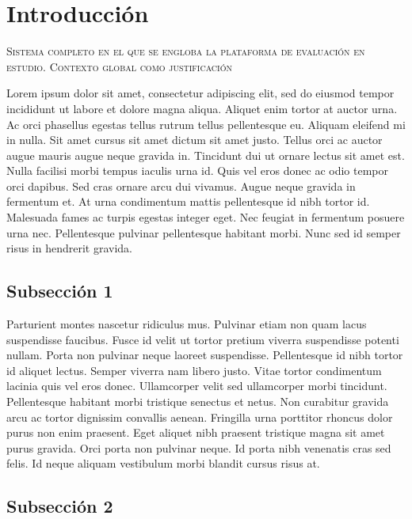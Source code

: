 \section{Introducción}

\vspace{0.5cm}

\Large\scshape
Sistema completo en el que se engloba la plataforma de evaluación en estudio. Contexto global como justificación
\normalfont

\divider

Lorem ipsum dolor sit amet, consectetur adipiscing elit, sed do eiusmod tempor incididunt ut labore et dolore magna aliqua. Aliquet enim tortor at auctor urna. Ac orci phasellus egestas tellus rutrum tellus pellentesque eu. Aliquam eleifend mi in nulla. Sit amet cursus sit amet dictum sit amet justo. Tellus orci ac auctor augue mauris augue neque gravida in. Tincidunt dui ut ornare lectus sit amet est. Nulla facilisi morbi tempus iaculis urna id. Quis vel eros donec ac odio tempor orci dapibus. Sed cras ornare arcu dui vivamus. Augue neque gravida in fermentum et. At urna condimentum mattis pellentesque id nibh tortor id. Malesuada fames ac turpis egestas integer eget. Nec feugiat in fermentum posuere urna nec. Pellentesque pulvinar pellentesque habitant morbi. Nunc sed id semper risus in hendrerit gravida.\\

\subsection{Subsección 1}

Parturient montes nascetur ridiculus mus. Pulvinar etiam non quam lacus suspendisse faucibus. Fusce id velit ut tortor pretium viverra suspendisse potenti nullam. Porta non pulvinar neque laoreet suspendisse. Pellentesque id nibh tortor id aliquet lectus. Semper viverra nam libero justo. Vitae tortor condimentum lacinia quis vel eros donec. Ullamcorper velit sed ullamcorper morbi tincidunt. Pellentesque habitant morbi tristique senectus et netus. Non curabitur gravida arcu ac tortor dignissim convallis aenean. Fringilla urna porttitor rhoncus dolor purus non enim praesent. Eget aliquet nibh praesent tristique magna sit amet purus gravida. Orci porta non pulvinar neque. Id porta nibh venenatis cras sed felis. Id neque aliquam vestibulum morbi blandit cursus risus at.\\

\subsection{Subsección 2}

